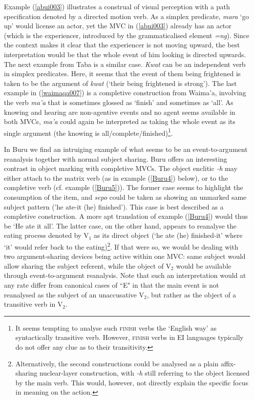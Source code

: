 Example (\ref{abui003}) illustrates a construal of visual perception with a path specification denoted by a directed motion verb. As a simplex predicate, \textit{mara} `go up' would license an actor, yet the MVC in (\ref{abui003}) already has an actor (which is the experiencer, introduced by the grammaticalised element \textit{=ng}). Since the context makes it clear that the experiencer is not moving upward, the best interpretation would be that the whole event of him looking is directed upwards. The next example from Taba is a similar case. \textit{Kwat} can be an independent verb in simplex predicates. Here, it seems that the event of them being frightened is taken to be the argument of \textit{kwat} (`their being frightened is strong'). The last example in (\ref{waimaqa007}) is a completive construction from Waima'a, involving the verb \textit{ma'a} that is sometimes glossed as `finish' and sometimes as `all'. As knowing and hearing are non-agentive events and no agent seems available in both MVCs, \textit{ma'a} could again be interpreted as taking the whole event as its single argument (the knowing is all/complete/finished)\footnote{It seems tempting to analyse such \textsc{finish} verbs the `English way' as syntactically transitive verb. However, \textsc{finish} verbs in EI languages typically do not offer any clue as to their transitivity.}.

In Buru we find an intruiging example of what seems to be an event-to-argument reanalysis together with normal subject sharing. Buru offers an interesting contrast in object marking with completive MVCs. The object enclitic \textit{-h} may either attach to the matrix verb (as in example (\ref{Buru4}) below), or to the completive verb (cf. example (\ref{Buru5})). The former case seems to highlight the consumption of the item, and \textit{sepo} could be taken as showing an unmarked same subject pattern ('he ate-it (he) finished'). This case is best described as a completive construction. A more apt translation of example (\ref{Buru4}) would thus be `He ate it all'. The latter case, on the other hand, appears to reanalyse the eating process denoted by V$_1$ as its direct object (`he ate (he) finished-it' where `it' would refer back to the eating)\footnote{Alternatively, the second constructions could be analysed as a plain affix-sharing nuclear-layer construction, with \textit{-h} still referring to the object licensed by the main verb. This would, however, not directly explain the specific focus in meaning on the action.}. If that were so, we would be dealing with two argument-sharing devices being active within one MVC: same subject would allow sharing the subject referent, while the object of V$_2$ would be available through event-to-argument reanalysis. Note that such an interpretation would at any rate differ from canonical cases of ``E" in that the main event is not reanalysed as the subject of an unaccusative V$_2$, but rather as the object of a transitive verb in V$_2$. 

